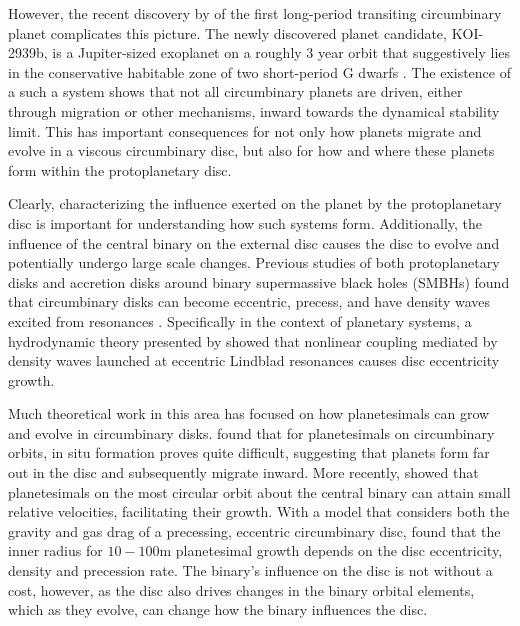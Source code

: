 However, the recent discovery by \citet{Kostov2016} of the first long-period transiting circumbinary planet complicates this picture.  The newly discovered planet candidate, KOI-2939b, is a Jupiter-sized exoplanet on a roughly 3 year orbit that suggestively lies in the conservative habitable zone of two short-period G dwarfs \citep{Kostov2016}.  The existence of a such a system shows that not all circumbinary planets are driven, either through migration or other mechanisms, inward towards the dynamical stability limit.  This has important consequences for not only how planets migrate and evolve in a viscous circumbinary disc, but also for how and where these planets form within the protoplanetary disc.

Clearly, characterizing the influence exerted on the planet by the protoplanetary disc is important for understanding how such systems form.  Additionally, the influence of the central binary on the external disc causes the disc to evolve and potentially undergo large scale changes.  Previous studies of both protoplanetary disks and accretion disks around binary supermassive black holes (SMBHs) found that circumbinary disks can become eccentric, precess, and have density waves excited from resonances \citep{Dunhill2015,MacFadyen2008,Papaloizou2001,Pierens2007,Pierens2013,Roedig2012}.  Specifically in the context of planetary systems, a hydrodynamic theory presented by \citet{Lubow1991} showed that nonlinear coupling mediated by density waves launched at eccentric Lindblad resonances causes disc eccentricity growth. 

Much theoretical work in this area has focused on how planetesimals
can grow and evolve in circumbinary disks.  \citet{Paardekooper2012}
found that for planetesimals on circumbinary orbits, in situ formation
proves quite difficult, suggesting that planets form far out in the
disc and subsequently migrate inward.  More recently, \citet{Bromley2015}
showed that planetesimals on the most circular orbit about the central
binary can attain small relative velocities, facilitating their growth.
With a model that considers both the gravity and gas drag of a
precessing, eccentric circumbinary disc, \citet{Silsbee2015a} found that
the inner radius for $10-100$m planetesimal growth depends on the disc eccentricity, density and precession rate.  The binary's influence on the disc is not without a cost, however, as the disc also drives changes in the binary orbital elements, which as they evolve, can change how the binary influences the disc.

